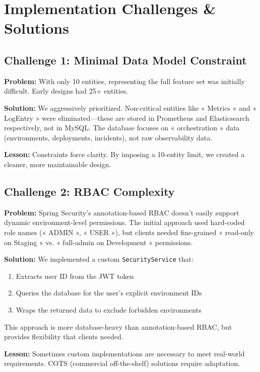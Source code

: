 \documentclass[12pt,a4paper]{report}
\begin{document}
\section{Implementation Challenges \& Solutions}

\subsection{Challenge 1: Minimal Data Model Constraint}

\textbf{Problem:} With only 10 entities, representing the full feature set was initially difficult. Early designs had 25+ entities.

\textbf{Solution:} We aggressively prioritized. Non-critical entities like « Metrics » and « LogEntry » were eliminated—these are stored in Prometheus and Elasticsearch respectively, not in MySQL. The database focuses on « orchestration » data (environments, deployments, incidents), not raw observability data.

\textbf{Lesson:} Constraints force clarity. By imposing a 10-entity limit, we created a cleaner, more maintainable design.

\subsection{Challenge 2: RBAC Complexity}

\textbf{Problem:} Spring Security's annotation-based RBAC doesn't easily support dynamic environment-level permissions. The initial approach used hard-coded role names (« ADMIN », « USER »), but clients needed fine-grained « read-only on Staging » vs. « full-admin on Development » permissions.

\textbf{Solution:} We implemented a custom \texttt{SecurityService} that:
\begin{enumerate}
  \item Extracts user ID from the JWT token
  \item Queries the database for the user's explicit environment IDs
  \item Wraps the returned data to exclude forbidden environments
\end{enumerate}

This approach is more database-heavy than annotation-based RBAC, but provides flexibility that clients needed.

\textbf{Lesson:} Sometimes custom implementations are necessary to meet real-world requirements. COTS (commercial off-the-shelf) solutions require adaptation.
\end{document}

